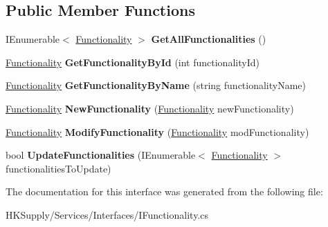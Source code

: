 \subsection*{Public Member Functions}
\begin{DoxyCompactItemize}
\item 
\mbox{\label{interface_h_k_supply_1_1_services_1_1_interfaces_1_1_i_functionality_aa1f16fee3ce5743db02605b4fd2184fc}} 
I\+Enumerable$<$ \hyperlink{class_h_k_supply_1_1_models_1_1_functionality}{Functionality} $>$ {\bfseries Get\+All\+Functionalities} ()
\item 
\mbox{\label{interface_h_k_supply_1_1_services_1_1_interfaces_1_1_i_functionality_a7652aa4269664c60c38868ca5691b39e}} 
\hyperlink{class_h_k_supply_1_1_models_1_1_functionality}{Functionality} {\bfseries Get\+Functionality\+By\+Id} (int functionality\+Id)
\item 
\mbox{\label{interface_h_k_supply_1_1_services_1_1_interfaces_1_1_i_functionality_a8b71832d394e3900a477c05c346489df}} 
\hyperlink{class_h_k_supply_1_1_models_1_1_functionality}{Functionality} {\bfseries Get\+Functionality\+By\+Name} (string functionality\+Name)
\item 
\mbox{\label{interface_h_k_supply_1_1_services_1_1_interfaces_1_1_i_functionality_ac11ba1039efa6437e0669e9617ea5c9c}} 
\hyperlink{class_h_k_supply_1_1_models_1_1_functionality}{Functionality} {\bfseries New\+Functionality} (\hyperlink{class_h_k_supply_1_1_models_1_1_functionality}{Functionality} new\+Functionality)
\item 
\mbox{\label{interface_h_k_supply_1_1_services_1_1_interfaces_1_1_i_functionality_a31203a06c78db03a2c9a69c0fa1a0865}} 
\hyperlink{class_h_k_supply_1_1_models_1_1_functionality}{Functionality} {\bfseries Modify\+Functionality} (\hyperlink{class_h_k_supply_1_1_models_1_1_functionality}{Functionality} mod\+Functionality)
\item 
\mbox{\label{interface_h_k_supply_1_1_services_1_1_interfaces_1_1_i_functionality_a7408965d17ce5d8a6fea11ac392ed451}} 
bool {\bfseries Update\+Functionalities} (I\+Enumerable$<$ \hyperlink{class_h_k_supply_1_1_models_1_1_functionality}{Functionality} $>$ functionalities\+To\+Update)
\end{DoxyCompactItemize}


The documentation for this interface was generated from the following file\+:\begin{DoxyCompactItemize}
\item 
H\+K\+Supply/\+Services/\+Interfaces/I\+Functionality.\+cs\end{DoxyCompactItemize}
